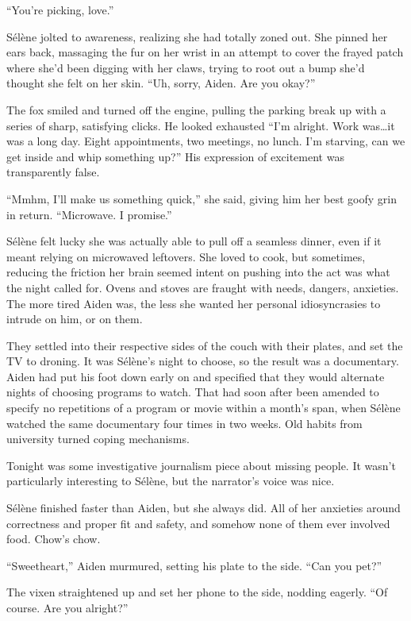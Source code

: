 ``You're picking, love.''

Sélène jolted to awareness, realizing she had totally zoned out. She pinned her ears back, massaging the fur on her wrist in an attempt to cover the frayed patch where she'd been digging with her claws, trying to root out a bump she'd thought she felt on her skin. ``Uh, sorry, Aiden. Are you okay?''

The fox smiled and turned off the engine, pulling the parking break up with a series of sharp, satisfying clicks. He looked exhausted ``I'm alright. Work was\ldots{}it was a long day. Eight appointments, two meetings, no lunch. I'm starving, can we get inside and whip something up?'' His expression of excitement was transparently false.

``Mmhm, I'll make us something quick,'' she said, giving him her best goofy grin in return. ``Microwave. I promise.''

Sélène felt lucky she was actually able to pull off a seamless dinner, even if it meant relying on microwaved leftovers. She loved to cook, but sometimes, reducing the friction her brain seemed intent on pushing into the act was what the night called for. Ovens and stoves are fraught with needs, dangers, anxieties. The more tired Aiden was, the less she wanted her personal idiosyncrasies to intrude on him, or on them.

They settled into their respective sides of the couch with their plates, and set the TV to droning. It was Sélène's night to choose, so the result was a documentary. Aiden had put his foot down early on and specified that they would alternate nights of choosing programs to watch. That had soon after been amended to specify no repetitions of a program or movie within a month's span, when Sélène watched the same documentary four times in two weeks. Old habits from university turned coping mechanisms.

Tonight was some investigative journalism piece about missing people. It wasn't particularly interesting to Sélène, but the narrator's voice was nice.

Sélène finished faster than Aiden, but she always did. All of her anxieties around correctness and proper fit and safety, and somehow none of them ever involved food. Chow's chow.

``Sweetheart,'' Aiden murmured, setting his plate to the side. ``Can you pet?''

The vixen straightened up and set her phone to the side, nodding eagerly. ``Of course. Are you alright?''

